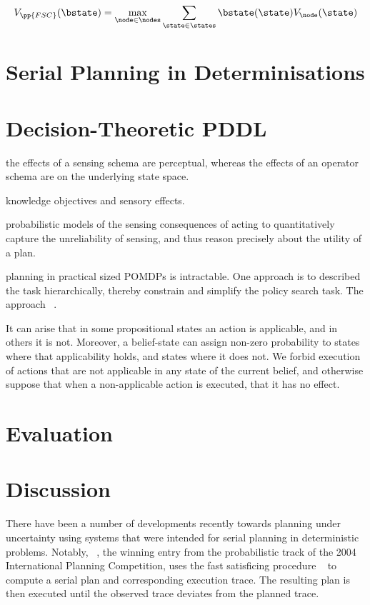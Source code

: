 \documentclass[letterpaper]{article}
\begin{document}
\begin{equation} \label{eq:valueBelief}
V_{\pp{FSC}}(\bstate) = \max_{\node \in \nodes} \sum_{\state \in \states} \bstate(\state) V_\node(\state)
\end{equation}





\section{Serial Planning in Determinisations}



\section{Decision-Theoretic PDDL}

the effects of a sensing schema are perceptual, whereas the effects of
an operator schema are on the underlying state space. 


knowledge objectives and  sensory effects. 


probabilistic models of the sensing consequences of acting to
quantitatively capture the unreliability of sensing, and thus reason
precisely about the utility of a plan. 


planning in practical sized POMDPs is intractable. One approach is to
described the task hierarchically, thereby constrain and simplify the
policy search task. The approach ~\cite{}. 



It can arise that in some propositional states an action is
applicable, and in others it is not. Moreover, a belief-state can
assign non-zero probability to states where that applicability holds,
and states where it does not. We forbid execution of actions that are
not applicable in any state of the current belief, and otherwise
suppose that when a non-applicable action is executed, that it has
no effect.


\section{Evaluation}


\section{Discussion}

There have been a number of developments recently towards planning
under uncertainty using systems that were intended for serial planning
in deterministic problems.  Notably,
~\cite{yoon:etal:2007}, the winning entry from the
probabilistic track of the 2004 International Planning Competition,
uses the fast satisficing procedure
~\cite{hoffmann:nebel:2001} to compute a serial plan and
corresponding execution trace. The resulting plan is then executed
until the observed trace deviates from the planned trace.
\end{document}
